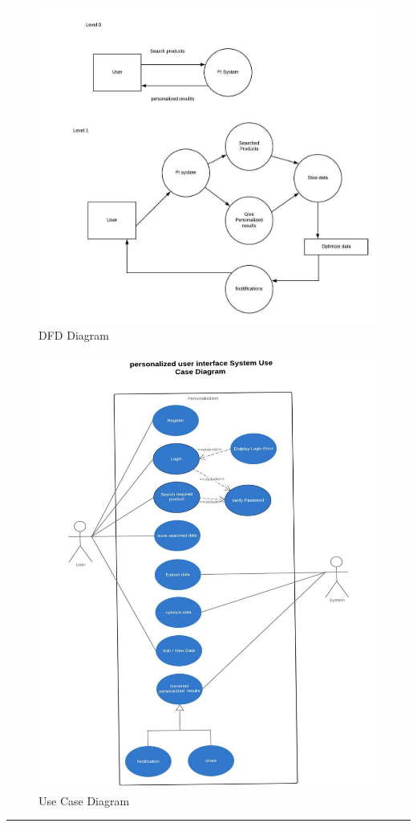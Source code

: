\begin{figure}[h!]
    \begin{center}
        \includegraphics[scale=0.45]{dfdd}
        \caption{DFD Diagram}
    \end{center}
\end{figure}

\begin{figure}[h!]
    \begin{center}
        \includegraphics[scale=0.6]{used}
        \caption{Use Case Diagram}
    \end{center}
\end{figure}
\vspace{10mm}
\hrule

